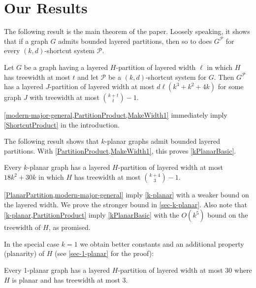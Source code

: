 \documentclass{patmorin}
\newcommand{\PP}{\mathcal{P}}
\renewcommand{\leq}{\leqslant}
\newcommand{\treewidth}{\ensuremath{\binom{k+4}{3}}-1}
\begin{document}
\section{Our Results}

The following result is the main theorem of the paper. Loosely speaking, it shows that if a graph $G$ admits bounded layered partitions, then so to does $G^\PP$ for every $(k,d)$-shortcut system $\PP$. 

\begin{thm}\label{modern-major-general}
  Let $G$ be a graph having a layered $H$-partition of layered width $\ell$ in which $H$ has treewidth at most $t$ and let $\PP$ be a $(k,d)$-shortcut system for $G$.  Then $G^\PP$ has a layered $J$-partition of layered width at most $d\ell(k^3+k^2+4k)$ for some graph $J$ with treewidth at most $\binom{k+t}{t}-1$.
\end{thm}

\cref{modern-major-general,PartitionProduct,MakeWidth1} immediately imply \cref{ShortcutProduct} in the introduction.

The following result shows that $k$-planar graphs admit bounded layered partitions. With \cref{PartitionProduct,MakeWidth1}, this proves \cref{kPlanarBasic}. %

\begin{thm}
\label{k-planar}
Every $k$-planar graph has a layered $H$-partition of layered width at most $18k^2 + 30k$ in which $H$ has treewidth at most $\binom{k+4}{3}-1$. %
\end{thm}

\cref{PlanarPartition,modern-major-general} imply \cref{k-planar} with a weaker bound on the layered width. We prove the stronger bound in \cref{sec-k-planar}. Also note that \cref{k-planar,PartitionProduct} imply \cref{kPlanarBasic} with the $O(k^5)$ bound on the treewidth of $H$, as promised. 

In the special case $k=1$ we obtain better constants and an additional property (planarity) of $H$ (see \cref{sec-1-planar} for the proof):

\begin{thm}
\label{1-planar}
Every 1-planar graph has a layered $H$-partition of layered width at most 30 where $H$ is planar and has treewidth at most 3.
\end{thm}

\end{document}
